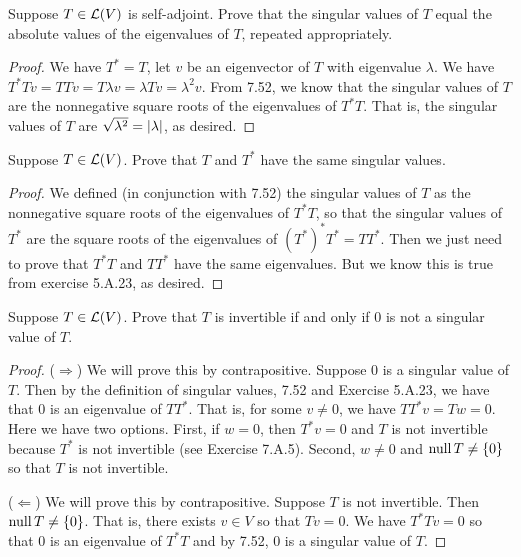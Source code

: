 \begin{exercise}{10}
  Suppose $T\in\mathcal{L}(V)$ is self-adjoint. Prove that the singular values of $T$ equal the absolute values of the eigenvalues of $T$, repeated appropriately.
\end{exercise}
\begin{proof}
 We have $T^\ast =T$, let $v$ be an eigenvector of $T$ with eigenvalue $\lambda$. We have $T^\ast Tv =TTv =T\lambda v =\lambda Tv =\lambda^2v$. From 7.52, we know that the singular values of $T$ are the nonnegative square roots of the eigenvalues of $T^\ast T$. That is, the singular values of $T$ are $\sqrt{\lambda^2} =\left\lvert \lambda\right\rvert$, as desired.
\end{proof}

\begin{exercise}{11}
  Suppose $T\in\mathcal{L}(V)$. Prove that $T$ and $T^\ast$ have the same singular values.
\end{exercise}
\begin{proof}
 We defined (in conjunction with 7.52) the singular values of $T$ as the nonnegative square roots of the eigenvalues of $T^\ast T$, so that the singular values of $T^\ast$ are the square roots of the eigenvalues of $(T^\ast)^\ast T^\ast =TT^\ast$. Then we just need to prove that $T^\ast T$ and $TT^\ast$ have the same eigenvalues. But we know this is true from exercise 5.A.23, as desired.
\end{proof}

\begin{exercise}{13}
  Suppose $T\in\mathcal{L}(V)$. Prove that $T$ is invertible if and only if 0 is not a singular value of $T$.
\end{exercise}
\begin{proof}
 ($\Rightarrow$) We will prove this by contrapositive. Suppose 0 is a singular value of $T$. Then by the definition of singular values, 7.52 and Exercise 5.A.23, we have that 0 is an eigenvalue of $TT^\ast$. That is, for some $v\neq 0$, we have $TT^\ast v =Tw =0$. Here we have two options. First, if $w=0$, then $T^\ast v=0$ and $T$ is not invertible because $T^\ast$ is not invertible (see Exercise 7.A.5). Second, $w\neq 0$ and $\operatorname*{null} T\neq\{0\}$ so that $T$ is not invertible.

 ($\Leftarrow$) We will prove this by contrapositive. Suppose $T$ is not invertible. Then $\operatorname*{null} T\neq\{0\}$. That is, there exists $v\in V$ so that $Tv=0$. We have $T^\ast Tv =0$ so that $0$ is an eigenvalue of $T^\ast T$ and by 7.52, 0 is a singular value of $T$.
\end{proof}

